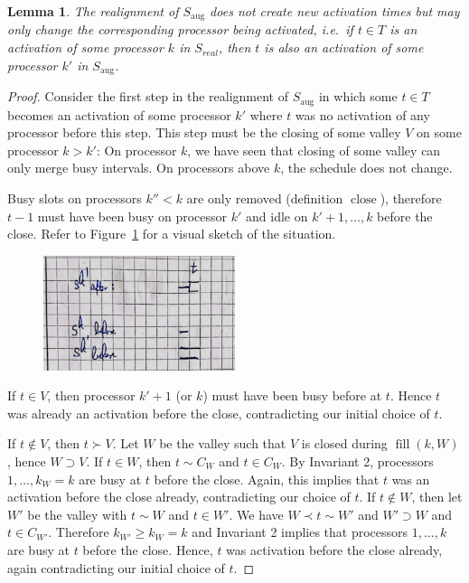 \documentclass[a4paper]{article}
\DeclareMathOperator{\aug}{aug}
\DeclareMathOperator{\fillop}{fill}
\DeclareMathOperator{\close}{close}
\newtheorem{lemma}[theorem]{Lemma}
\begin{document}
\begin{lemma}\label{lemma:activations}
  The realignment of $S_{\aug}$ does not create new activation times but may only change the corresponding processor being activated, i.e.\ if $t \in T$ is an activation of some processor $k$ in $S_{real}$, then $t$ is also an activation of some processor $k'$ in $S_{\aug}$.
\end{lemma}
\begin{proof}
  Consider the first step in the realignment of $S_{\aug}$ in which some $t \in T$ becomes an activation of some processor $k'$ where $t$ was no activation of any processor before this step.
  This step must be the closing of some valley $V$ on some processor $k > k'$:
  On processor $k$, we have seen that closing of some valley can only merge busy intervals.
  On processors above $k$, the schedule does not change.

  Busy slots on processors $k'' < k$ are only removed (definition $\close$), therefore $t-1$ must have been busy on processor $k'$ and idle on $k' + 1, \ldots, k$ before the close.
  Refer to Figure~\ref{fig:activations} for a visual sketch of the situation.

  \begin{figure}[H]
    \centering
    \includegraphics[width=0.5\textwidth]{graphics/sketches/activations.png}\label{fig:activations}
    \caption{}
  \end{figure}

  If $t \in V$, then processor $k' + 1$ (or $k$) must have been busy before at $t$.
  Hence $t$ was already an activation before the close, contradicting our initial choice of $t$.

  If $t \notin V$, then $t \succ V$.
  Let $W$ be the valley such that $V$ is closed during $\fillop(k, W)$, hence $W \supset V$.
  If $t \in W$, then $t \sim C_W$ and $t \in C_W$.
  By Invariant 2, processors $1, \ldots, k_W = k$ are busy at $t$ before the close.
  Again, this implies that $t$ was an activation before the close already, contradicting our choice of $t$.
  If $t \notin W$, then let $W'$ be the valley with $t \sim W$ and $t \in W'$.
  We have $W \prec t \sim W'$ and $W' \supset W$ and $t \in C_{W'}$.
  Therefore $k_{W'} \geq k_W = k$ and Invariant 2 implies that processors $1, \ldots, k$ are busy at $t$ before the close.
  Hence, $t$ was activation before the close already, again contradicting our initial choice of $t$.
\end{proof}
\end{document}
